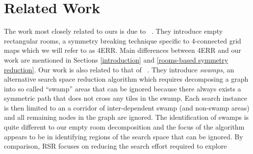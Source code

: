 \section{Related Work}
The work most closely related to ours is due to
\citeauthor{harabor10}~. 
They introduce empty rectangular rooms,
a symmetry breaking technique specific to 4-connected grid maps
which we will refer to as 4ERR.
Main differences between 4ERR and our work are mentioned in 
Sections \ref{introduction} and \ref{rooms-based symmetry reduction}.
Our work is also related to that of \citeauthor{pochter10}~. 
They introduce \emph{swamps}, an alternative search space reduction algorithm
which requires decomposing a graph into so called ``swamp'' areas that can be 
ignored because there always exists a symmetric path that does not cross any 
tiles in the swamp. 
Each search instance is then limited to an a corridor of inter-dependent 
swamp (and non-swamp areas) and all remaining nodes in the graph are ignored.
The identification of swamps is quite different to our empty room decomposition
and the focus of the algorithm appears to be in identifying regions of the
search space that can be ignored.
By comparison, RSR focuses on reducing the search effort required to explore

